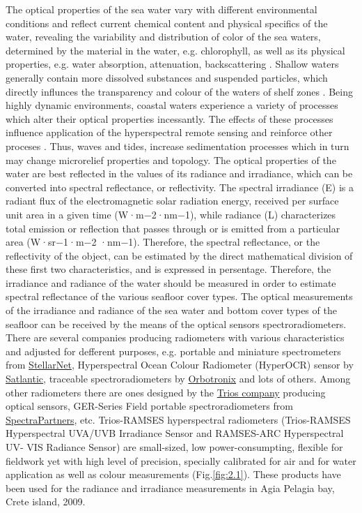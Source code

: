 \documentclass[10pt, a4paper]{article}
\begin{document}
The optical properties of the sea water vary with different environmental conditions and reflect
current chemical content and physical specifics of the water, revealing the variability and distribution
of color of the sea waters, determined by the material in the water, e.g. chlorophyll, as well as its
physical properties, e.g. water absorption, attenuation, backscattering \cite{Maffione01a}\label{Maffione01a}.
Shallow waters generally contain more dissolved substances and suspended particles, which directly
influnces the transparency and colour of the waters of shelf zones \cite{Jerlov52}\label{Jerlov52}. Being highly
dynamic environments, coastal waters experience a variety of processes which alter their optical
properties incessantly. The effects of these processes influence application of the hyperspectral
remote sensing and reinforce other proceses \cite{Maffione01b}\label{Maffione01b}. Thus, waves and tides, increase
sedimentation processes which in turn may change microrelief properties and topology. 
The optical properties of the water are best reflected in the values of its radiance and irradiance,
which can be converted into spectral reflectance, or reflectivity. The spectral irradiance (E) is a
radiant flux of the electromagnetic solar radiation energy, received per surface unit area in a given
time (W·m−2·nm−1), while radiance (L) characterizes total emission or reflection that passes through
or is emitted from a particular area (W·sr−1·m−2 ·nm−1). Therefore, the spectral reflectance, or the
reflectivity of the object, can be estimated by the direct mathematical division of these first two
characteristics, and is expressed in persentage.
Therefore, the irradiance and radiance of the water should be measured in order to estimate spectral
reflectance of the various seafloor cover types. The optical measurements of the irradiance and
radiance of the sea water and bottom cover types of the seafloor can be received by the means of the
optical sensors spectroradiometers. There are several companies producing radiometers with various
characteristics and adjusted for defferent purposes, e.g. portable and miniature spectrometers from
\href{http://www.stellarnet.us}{StellarNet}, Hyperspectral Ocean Colour Radiometer (HyperOCR) sensor by
\href{http://www.satlantic.com}{Satlantic}, traceable spectroradiometers by \href{http://www.orboptronix.com}{Orbotronix} 
and lots of others. Among other radiometers there are ones designed by the \href{http://www.trios.de/}{Trios company} producing
optical sensors, GER-Series Field portable spectroradiometers from
\href{http://www.spectrapartners.nl/}{SpectraPartners}, etc. Trios-RAMSES hyperspectral radiometers
(Trios-RAMSES Hyperspectral UVA/UVB Irradiance Sensor and RAMSES-ARC Hyperspectral UV-
VIS Radiance Sensor) are small-sized, low power-consumpting, flexible for fieldwork yet with high
level of precision, specially calibrated for air and for water application as well as colour
measurements  (Fig.\ref{fig:2.1}). These products have been used for the radiance and irradiance
measurements in Agia Pelagia bay, Crete island, 2009.
\end{document}
